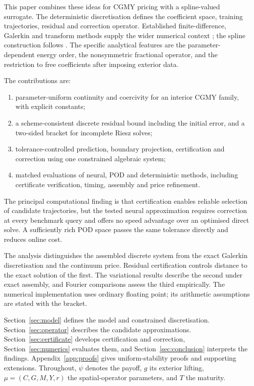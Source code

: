 \documentclass[11pt]{amsart}
\theoremstyle{remark}
\begin{document}
This paper combines these ideas for CGMY pricing with a spline-valued
surrogate. The deterministic discretisation defines the coefficient space,
training trajectories, residual and correction operator. Established
finite-difference, Galerkin and transform methods supply the wider numerical
context \cite{ContVoltchkova2005,MatacheVonPetersdorffSchwab2004,
HilberReichmannSchwabWinter2013,FangOosterlee2008}; the spline construction
follows \cite{DamircheliCGMY2026}. The specific analytical features are the
parameter-dependent energy order, the nonsymmetric fractional operator,
and the restriction to free coefficients after imposing exterior data.

The contributions are:
\begin{enumerate}[leftmargin=2em]
\item parameter-uniform continuity and coercivity for an interior CGMY
family, with explicit constants;
\item a scheme-consistent discrete residual bound including the initial
error, and a two-sided bracket for incomplete Riesz solves;
\item tolerance-controlled prediction, boundary projection, certification
and correction using one constrained algebraic system;
\item matched evaluations of neural, POD and deterministic methods,
including certificate verification, timing, assembly and price refinement.
\end{enumerate}
The principal computational finding is that certification enables reliable
selection of candidate trajectories, but the tested neural approximation
requires correction at every benchmark query and offers no speed advantage
over an optimised direct solve. A sufficiently rich POD space passes the
same tolerance directly and reduces online cost.

The analysis distinguishes the assembled discrete system from the exact
Galerkin discretisation and the continuum price. Residual certification
controls distance to the exact solution of the first. The variational
results describe the second under exact assembly, and Fourier comparisons
assess the third empirically. The numerical implementation uses ordinary
floating point; its arithmetic assumptions are stated with the bracket.

Section~\ref{sec:model} defines the model and constrained discretisation.
Section~\ref{sec:operator} describes the candidate approximations.
Section~\ref{sec:certificate} develops certification and correction,
Section~\ref{sec:numerics} evaluates them, and
Section~\ref{sec:conclusion} interprets the findings.
Appendix~\ref{app:proofs} gives uniform-stability proofs and supporting
extensions. Throughout, $\psi$ denotes the payoff, $g$ its exterior lifting,
$\mu=(C,G,M,Y,r)$ the spatial-operator parameters, and $T$ the maturity.
\end{document}
